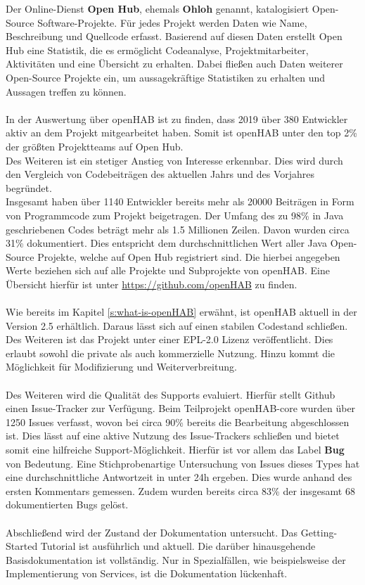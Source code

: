 Der Online-Dienst \textbf{Open Hub}, ehemals \textbf{Ohloh} genannt, katalogisiert Open-Source Software-Projekte. Für jedes Projekt werden Daten wie Name, Beschreibung und Quellcode erfasst. Basierend auf diesen Daten erstellt Open Hub eine Statistik, die es ermöglicht Codeanalyse, Projektmitarbeiter, Aktivitäten und eine Übersicht zu erhalten. Dabei fließen auch Daten weiterer Open-Source Projekte ein, um aussagekräftige Statistiken zu erhalten und Aussagen treffen zu können.\\
\\
{In der Auswertung über openHAB ist zu finden, dass 2019 über 380 Entwickler aktiv an dem Projekt mitgearbeitet haben. Somit ist openHAB unter den top 2\% der größten Projektteams auf Open Hub.\\
Des Weiteren ist ein stetiger Anstieg von Interesse erkennbar. Dies wird durch den Vergleich von Codebeiträgen des aktuellen Jahrs und des Vorjahres begründet.\\
Insgesamt haben über 1140 Entwickler bereits mehr als 20000 Beiträgen in Form von Programmcode zum Projekt beigetragen. Der Umfang des zu 98\% in Java geschriebenen Codes beträgt mehr als 1.5 Millionen Zeilen. Davon wurden circa 31\% dokumentiert. Dies entspricht dem durchschnittlichen Wert aller Java Open-Source Projekte, welche auf Open Hub registriert sind.}\cite{OPENHUB01:OH} Die hierbei angegeben Werte beziehen sich auf alle Projekte und Subprojekte von openHAB. Eine Übersicht hierfür ist unter \url{https://github.com/openHAB} zu finden.\\
\\
Wie bereits im Kapitel \ref{s:what-is-openHAB} erwähnt, ist openHAB aktuell in der Version 2.5 erhältlich. Daraus lässt sich auf einen stabilen Codestand schließen.\\
Des Weiteren ist das Projekt unter einer EPL-2.0 Lizenz veröffentlicht. Dies erlaubt sowohl die private als auch kommerzielle Nutzung. Hinzu kommt die Möglichkeit für Modifizierung und Weiterverbreitung.\cite{LICENSE01:EC}
\\
\\
Des Weiteren wird die Qualität des Supports evaluiert. Hierfür stellt Github einen Issue-Tracker zur Verfügung. Beim Teilprojekt openHAB-core wurden über 1250 Issues verfasst, wovon bei circa 90\% bereits die Bearbeitung abgeschlossen ist.\cite{GITHUB01:OS} Dies lässt auf eine aktive Nutzung des Issue-Trackers schließen und bietet somit eine hilfreiche Support-Möglichkeit. Hierfür ist vor allem das Label \textbf{Bug} von Bedeutung. Eine Stichprobenartige Untersuchung von Issues dieses Types hat eine durchschnittliche Antwortzeit in unter 24h ergeben. Dies wurde anhand des ersten Kommentars gemessen. Zudem wurden bereits circa 83\% der insgesamt 68 dokumentierten Bugs gelöst.
\\
\\
Abschließend wird der Zustand der Dokumentation untersucht.
Das Getting-Started Tutorial ist ausführlich und aktuell. Die darüber hinausgehende Basisdokumentation ist vollständig. Nur in Spezialfällen, wie beispielsweise der Implementierung von Services, ist die Dokumentation lückenhaft.\cite{openHAB01:OH}

